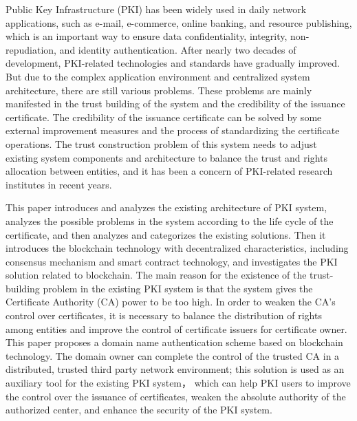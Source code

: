 \begin{cabstract}




\end{cabstract}




\begin{eabstract}
Public Key Infrastructure (PKI) has been widely used in daily network applications, such as e-mail, e-commerce, online banking, and resource publishing, which is an important way to ensure data confidentiality, integrity, non-repudiation, and identity authentication. After nearly two decades of development, PKI-related technologies and standards have gradually improved. But due to the complex application environment and centralized system architecture, there are still various problems. These problems are mainly manifested in the trust building of the system and the credibility of the issuance certificate. The credibility of the issuance certificate can be solved by some external improvement measures and the process of standardizing the certificate operations. The trust construction problem of this system needs to adjust existing system components and architecture to balance the trust and rights allocation between entities, and it has been a concern of PKI-related research institutes in recent years.

This paper introduces and analyzes the existing architecture of PKI system, analyzes the possible problems in the system according to the life cycle of the certificate, and then analyzes and categorizes the existing solutions. Then it introduces the blockchain technology with decentralized characteristics, including consensus mechanism and smart contract technology, and investigates the PKI solution related to blockchain. The main reason for the existence of the trust-building problem in the existing PKI system is that the system gives the Certificate Authority (CA) power to be too high. In order to weaken the CA's control over certificates, it is necessary to balance the distribution of rights among entities and improve the control of certificate issuers for certificate owner. This paper proposes a domain name authentication scheme based on blockchain technology. The domain owner can complete the control of the trusted CA in a distributed, trusted third party network environment; this solution is used as an auxiliary tool for the existing PKI system， which can help PKI users to improve the control over the issuance of certificates, weaken the absolute authority of the authorized center, and enhance the security of the PKI system.


\end{eabstract}

